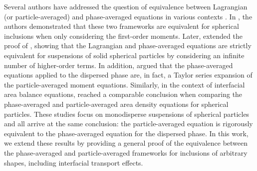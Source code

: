 




Several authors have addressed the question of equivalence between Lagrangian (or particle-averaged) and phase-averaged equations in various contexts \citep{zhang1997momentum,lhuillier2000bilan,nott2011suspension}. 
In \citet[Appendix A]{zhang1997momentum}, the authors demonstrated that these two frameworks are equivalent for spherical inclusions when only considering the first-order moments. 
Later, \citet[Appendix A]{nott2011suspension} extended the proof of \citet{zhang1997momentum}, showing that the Lagrangian and phase-averaged equations are strictly equivalent for suspensions of solid spherical particles by considering an infinite number of higher-order terms. 
In addition, \citet{lhuillier2010multiphase} argued that the phase-averaged equations applied to the dispersed phase are, in fact, a Taylor series expansion of the particle-averaged moment equations.
Similarly, in the context of interfacial area balance equations, \citet{lhuillier2000bilan} reached a comparable conclusion when comparing the phase-averaged and particle-averaged area density equations for spherical particles. 
These studies focus on monodisperse suspensions of spherical particles and all arrive at the same conclusion: the particle-averaged equation is rigorously equivalent to the phase-averaged equation for the dispersed phase.
In this work, we extend these results by providing a general proof of the equivalence between the phase-averaged and particle-averaged frameworks for inclusions of arbitrary shapes, including interfacial transport effects.

